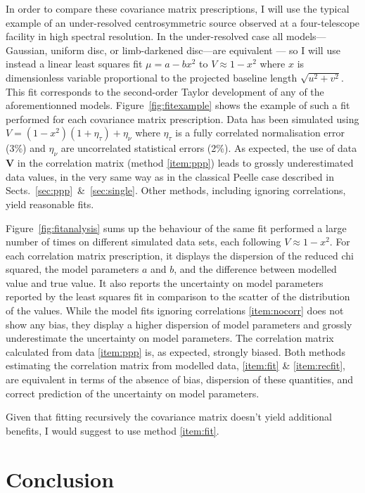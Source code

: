 \documentclass[a4paper,fleqn,usenatbib]{mnras}
\def\vec#1{\ensuremath{\boldsymbol{#1}}}
\def\norm{_\tau}
\def\meas{_\nu}
\def\data{\ensuremath{{\scriptstyle V}}}
\def\vdata{\ensuremath{\vec\data}}
\def\mod{\ensuremath{\mu}}
\def\error{\ensuremath{\eta}}
\def\relerror{\ensuremath{\error\norm}}
\def\abserror{\ensuremath{\error\meas}}
\begin{document}
In order to compare these covariance matrix prescriptions, I will use the typical example of an under-resolved centrosymmetric source observed at a four-telescope facility in high spectral resolution. In the under-resolved case all models---Gaussian, uniform disc, or limb-darkened disc---are equivalent \citep{LAC03}--- so I will use instead a linear least squares fit $\mod = a - bx^2$ to $\data \approx 1 - x^2$ where $x$ is dimensionless variable proportional to the projected baseline length $\sqrt{u^2+v^2}$. This fit corresponds to the second-order Taylor development of any of the aforementionned models.  Figure~\ref{fig:fitexample} shows the example of such a fit performed for each covariance matrix prescription.  Data has been simulated using $\data = (1-x^2)(1 + \relerror) + \abserror$ where $\relerror$ is a fully correlated normalisation error (3\%) and $\abserror$ are uncorrelated statistical errors (2\%). As expected, the use of data $\vdata$ in the correlation matrix (method \ref{item:ppp}) leads to grossly underestimated data values, in the very same way as in the classical Peelle case described in Sects.~\ref{sec:ppp}~\&~\ref{sec:single}.  Other methods, including ignoring correlations, yield reasonable fits.

Figure~\ref{fig:fitanalysis} sums up the behaviour of the same fit performed a large number of times on different simulated data sets, each following $\data \approx 1-x^2$.  For each correlation matrix prescription, it displays the dispersion of the reduced chi squared, the model parameters $a$ and $b$, and the difference between modelled value and true value. It also reports the uncertainty on model parameters reported by the least squares fit in comparison to the scatter of the distribution of the values. While the model fits ignoring correlations \ref{item:nocorr} does not show any bias, they display a higher dispersion of model parameters and grossly underestimate the uncertainty on model parameters.  The correlation matrix calculated from data \ref{item:ppp} is, as expected, strongly biased. Both methods estimating the correlation  matrix from modelled data, \ref{item:fit} \& \ref{item:recfit}, are equivalent in terms of the absence of bias, dispersion of these quantities, and correct prediction of the uncertainty on model parameters.

Given that fitting recursively the covariance matrix doesn't yield additional benefits, I would suggest to use method \ref{item:fit}.  



\section{Conclusion}
\end{document}
